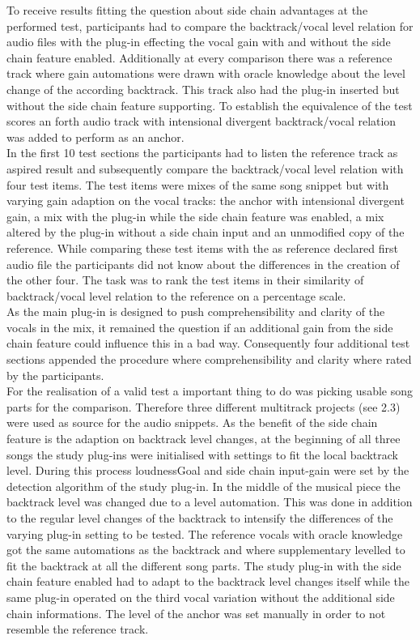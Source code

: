 To receive results fitting the question about side chain advantages at the performed test, participants had to compare the backtrack/vocal level relation for audio files with the plug-in effecting the vocal gain with and without the side chain feature enabled. Additionally at every comparison there was a reference track where gain automations were drawn with oracle knowledge about the level change of the according backtrack. This track also had the plug-in inserted but without the side chain feature supporting. To establish the equivalence of the test scores an forth audio track with intensional divergent backtrack/vocal relation was added to perform as an anchor.\\
In the first 10 test sections the participants had to listen the reference track as aspired result and subsequently compare the backtrack/vocal level relation with four test items. The test items were mixes of the same song snippet but with varying gain adaption on the vocal tracks: the anchor with intensional divergent gain, a mix with the plug-in while the side chain feature was enabled, a mix altered by the plug-in without a side chain input and an unmodified copy of the reference. While comparing these test items with the as reference declared first audio file the participants did not know about the differences in the creation of the other four. The task was to rank the test items in their similarity of backtrack/vocal level relation to the reference on a percentage scale.\\
As the main plug-in is designed to push comprehensibility and clarity of the vocals in the mix, it remained the question if an additional gain from the side chain feature could influence this in a bad way. Consequently four additional test sections appended the procedure where comprehensibility and clarity where rated by the participants.\\
For the realisation of a valid test a important thing to do was picking usable song parts for the comparison. Therefore three different multitrack projects (see 2.3) were used as source for the audio snippets. As the benefit of the side chain feature is the adaption on backtrack level changes, at the beginning of all three songs the study plug-ins were initialised with settings to fit the local backtrack level. During this process loudnessGoal and side chain input-gain were set by the detection algorithm of the study plug-in. In the middle of the musical piece the backtrack level was changed due to a level automation. This was done in addition to the regular level changes of the backtrack to intensify the differences of the varying plug-in setting to be tested. The reference vocals with oracle knowledge got the same automations as the backtrack and where supplementary levelled to fit the backtrack at all the different song parts. The study plug-in with the side chain feature enabled had to adapt to the backtrack level changes itself while the same plug-in operated on the third vocal variation without the additional side chain informations. The level of the anchor was set manually in order to not resemble the reference track.\\
